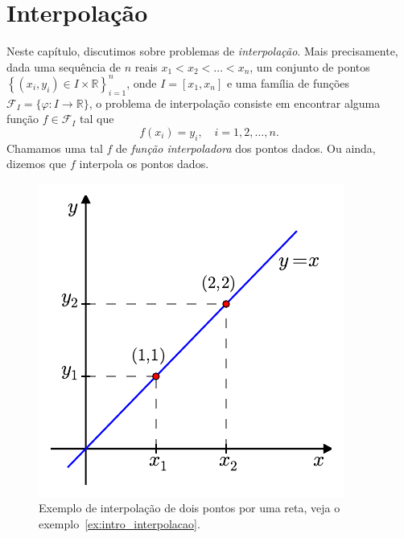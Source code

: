 
%

\chapter{Interpolação}

Neste capítulo, discutimos sobre problemas de \emph{interpolação}. Mais precisamente, dada uma sequência de $n$ reais $x_1<x_2<\ldots<x_n$, um conjunto de pontos $\left\{(x_i, y_i)\in I\times\mathbb{R}\right\}_{i=1}^n$, onde $I=\left[x_1,x_n\right]$ e uma família de funções $\mathcal{F}_I = \{\varphi:I\rightarrow\mathbb{R}\}$, o problema de interpolação consiste em encontrar alguma função $f\in\mathcal{F}_I$ tal que
\begin{equation*}
  f(x_i) = y_i,\quad i=1, 2, \dotsc, n.
\end{equation*}
Chamamos uma tal $f$ de \emph{função interpoladora} dos pontos dados. Ou ainda, dizemos que $f$ interpola os pontos dados.

\begin{figure}
  \centering
  \includegraphics[scale=0.9]{./cap_interp/pics/ex_intro_interpolacao/ex_intro_interpolacao}
  \caption{Exemplo de interpolação de dois pontos por uma reta, veja o exemplo~\ref{ex:intro_interpolacao}.}\label{fig:ex_intro_interp}
\end{figure}

